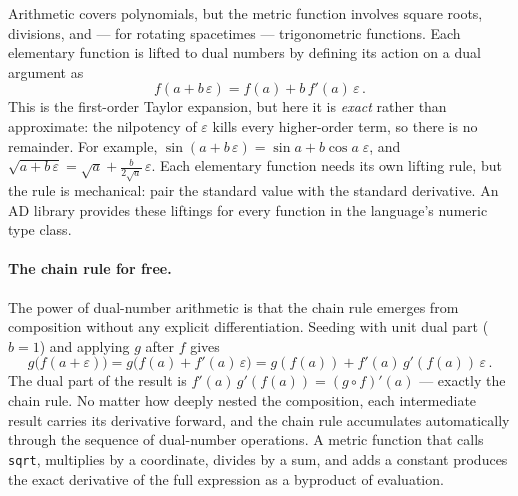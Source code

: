 Arithmetic covers polynomials, but the metric function
involves square roots, divisions, and --- for rotating
spacetimes --- trigonometric functions.  Each elementary
function is lifted to dual numbers by defining its action on
a dual argument as
%
\begin{equation}
  f(a + b\,\varepsilon)
    = f(a) + b\,f'(a)\,\varepsilon \,.
  \label{eq:dual-lift}
\end{equation}
%
This is the first-order Taylor expansion, but here it is
\emph{exact} rather than approximate: the nilpotency of
$\varepsilon$ kills every higher-order term, so there is no
remainder.  For example,
$\sin(a + b\,\varepsilon) = \sin a + b\cos a\;\varepsilon$,
and
$\sqrt{a + b\,\varepsilon}
  = \sqrt{a} + \frac{b}{2\sqrt{a}}\,\varepsilon$.
Each elementary function needs its own lifting rule, but the
rule is mechanical: pair the standard value with the standard
derivative.  An AD library provides these liftings for every
function in the language's numeric type class.

\paragraph{The chain rule for free.}

The power of dual-number arithmetic is that the chain rule
emerges from composition without any explicit
differentiation.  Seeding with unit dual part ($b = 1$)
and applying $g$ after $f$ gives
%
\begin{equation}
  g\bigl(f(a + \varepsilon)\bigr)
    = g\bigl(f(a) + f'(a)\,\varepsilon\bigr)
    = g(f(a)) + f'(a)\,g'(f(a))\,\varepsilon \,.
  \label{eq:dual-chain}
\end{equation}
%
The dual part of the result is
$f'(a)\,g'(f(a)) = (g \circ f)'(a)$ --- exactly the chain
rule.  No matter how deeply nested the composition, each
intermediate result carries its derivative forward, and the
chain rule accumulates automatically through the sequence of
dual-number operations.  A metric function that calls
\texttt{sqrt}, multiplies by a coordinate, divides by a sum,
and adds a constant produces the exact derivative of the
full expression as a byproduct of evaluation.

